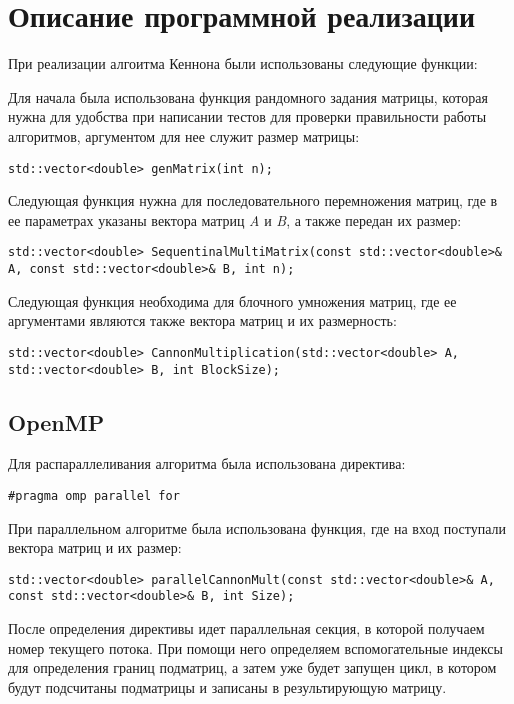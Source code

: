 \documentclass{report}
\begin{document}
\section*{Описание программной реализации}
При реализации алгоитма Кеннона были использованы следующие функции:
\par Для начала была использована функция рандомного задания матрицы, которая нужна для удобства при написании тестов для проверки правильности работы алгоритмов, аргументом для нее служит размер матрицы:
\begin{lstlisting}
std::vector<double> genMatrix(int n);
\end{lstlisting}
\par Следующая функция нужна для последовательного перемножения матриц, где в ее параметрах указаны вектора матриц {\itshape A} и {\itshape B}, а также передан их размер:
\begin{lstlisting}
std::vector<double> SequentinalMultiMatrix(const std::vector<double>& A, const std::vector<double>& B, int n);
\end{lstlisting}
\par Следующая функция необходима для блочного умножения матриц, где ее аргументами являются также вектора матриц и их размерность:
\begin{lstlisting}
std::vector<double> CannonMultiplication(std::vector<double> A, std::vector<double> B, int BlockSize);
\end{lstlisting}
\subsection*{OpenMP}
Для распараллеливания алгоритма была использована директива:
\par\verb|#pragma omp parallel for | 
\par При параллельном алгоритме была использована функция, где на вход поступали вектора матриц и их размер:
\begin{lstlisting}
std::vector<double> parallelCannonMult(const std::vector<double>& A, const std::vector<double>& B, int Size);
\end{lstlisting}
\par После определения директивы идет параллельная секция, в которой получаем номер текущего потока. При помощи него определяем вспомогательные индексы для определения границ подматриц, а затем уже будет запущен цикл, в котором будут подсчитаны подматрицы и записаны в результирующую матрицу.
\end{document}
